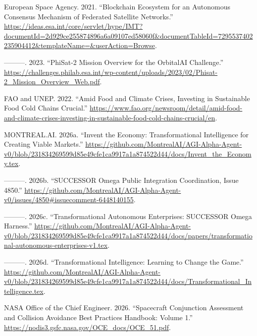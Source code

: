 \documentclass[11pt,letterpaper]{article}
\newenvironment{CSLReferences}[2]{\setlength{\parindent}{0pt}\setlength{\parskip}{0.6em}\small}{ }
\begin{document}
\hypertarget{refs}{}
\begin{CSLReferences}{1}{0}
\leavevmode{}%
European Space Agency. 2021. {``Blockchain Ecosystem for an Autonomous
Consensus Mechanism of Federated Satellite Networks.''}
\url{https://ideas.esa.int/core/servlet/hype/IMT?documentId=2d929ce255874896a6a09107ed58060f\&documentTableId=7295537402235904412\&templateName=\&userAction=Browse}.

\leavevmode{}%
---------. 2023. {``PhiSat-2 Mission Overview for the OrbitalAI
Challenge.''}
\url{https://challenges.philab.esa.int/wp-content/uploads/2023/02/Phisat-2_Mission_Overview_Web.pdf}.

\leavevmode{}%
FAO and UNEP. 2022. {``Amid Food and Climate Crises, Investing in
Sustainable Food Cold Chains Crucial.''}
\url{https://www.fao.org/newsroom/detail/amid-food-and-climate-crises-investing-in-sustainable-food-cold-chains-crucial/en}.

\leavevmode{}%
MONTREAL.AI. 2026a. {``Invent the Economy: Transformational Intelligence
for Creating Viable Markets.''}
\url{https://github.com/MontrealAI/AGI-Alpha-Agent-v0/blob/231834269599d85e49cfe1ca9917a1a874522d44/docs/Invent_the_Economy.tex}.

\leavevmode{}%
---------. 2026b. {``SUCCESSOR Omega Public Integration Coordination,
Issue 4850.''}
\url{https://github.com/MontrealAI/AGI-Alpha-Agent-v0/issues/4850\#issuecomment-6448140155}.

\leavevmode{}%
---------. 2026c. {``Transformational Autonomous Enterprises: SUCCESSOR
Omega Harness.''}
\url{https://github.com/MontrealAI/AGI-Alpha-Agent-v0/blob/231834269599d85e49cfe1ca9917a1a874522d44/docs/papers/transformational-autonomous-enterprises-v1.tex}.

\leavevmode{}%
---------. 2026d. {``Transformational Intelligence: Learning to Change
the Game.''}
\url{https://github.com/MontrealAI/AGI-Alpha-Agent-v0/blob/231834269599d85e49cfe1ca9917a1a874522d44/docs/Transformational_Intelligence.tex}.

\leavevmode{}%
NASA Office of the Chief Engineer. 2026. {``Spacecraft Conjunction
Assessment and Collision Avoidance Best Practices Handbook: Volume 1.''}
\url{https://nodis3.gsfc.nasa.gov/OCE_docs/OCE_51.pdf}.


\end{CSLReferences}
\end{document}
